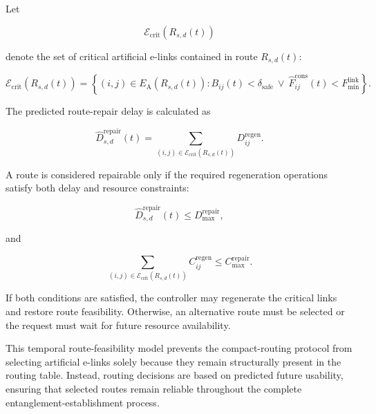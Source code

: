 Let

\begin{equation}
    \mathcal{E}_{\mathrm{crit}}
    \left(
    R_{s,d}(t)
    \right)
\end{equation}

denote the set of critical artificial e-links contained in route $R_{s,d}(t)$:

\begin{equation}
    \mathcal{E}_{\mathrm{crit}}
    \left(
    R_{s,d}(t)
    \right)
    =
    \left\{
    (i,j)
    \in
    E_{\mathrm{A}}
    \left(
    R_{s,d}(t)
    \right)
    :
    B_{ij}(t)
    <
    \delta_{\mathrm{safe}}
    \ \lor\
    \widehat{F}_{ij}^{\mathrm{cons}}(t)
    <
    F_{\min}^{\mathrm{link}}
    \right\}.
\end{equation}

The predicted route-repair delay is calculated as

\begin{equation}
    \widehat{D}_{s,d}^{\mathrm{repair}}(t)
    =
    \sum_{
    (i,j)
    \in
    \mathcal{E}_{\mathrm{crit}}
    (R_{s,d}(t))
    }
    D_{ij}^{\mathrm{regen}}.
\end{equation}

A route is considered repairable only if the required regeneration operations satisfy both delay and resource constraints:

\begin{equation}
    \widehat{D}_{s,d}^{\mathrm{repair}}(t)
    \leq
    D_{\max}^{\mathrm{repair}},
\end{equation}

and

\begin{equation}
    \sum_{
    (i,j)
    \in
    \mathcal{E}_{\mathrm{crit}}
    (R_{s,d}(t))
    }
    C_{ij}^{\mathrm{regen}}
    \leq
    C_{\max}^{\mathrm{repair}}.
\end{equation}

If both conditions are satisfied, the controller may regenerate the critical links and restore route feasibility. Otherwise, an alternative route must be selected or the request must wait for future resource availability.

This temporal route-feasibility model prevents the compact-routing protocol from selecting artificial e-links solely because they remain structurally present in the routing table. Instead, routing decisions are based on predicted future usability, ensuring that selected routes remain reliable throughout the complete entanglement-establishment process.
